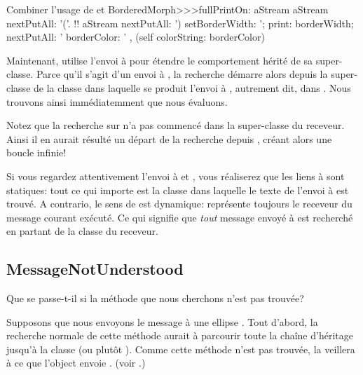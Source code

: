 \documentclass[a4paper,10pt,twoside]{book}
\begin{document}
\begin{method}[fullPrintOn]{Combiner l'usage de \super et \self}
BorderedMorph>>>fullPrintOn: aStream
	aStream nextPutAll: '('.
	!!
	aStream nextPutAll: ') setBorderWidth: '; print: borderWidth;
		nextPutAll: ' borderColor: ' , (self colorString: borderColor)
\end{method}
Maintenant,  utilise l'envoi à \super pour étendre le comportement  hérité de sa super-classe.
Parce qu'il s'agit d'un envoi à \super, la recherche démarre alors
depuis la super-classe de la classe dans laquelle se produit l'envoi à
\super, autrement dit, dans 
.
Nous trouvons ainsi immédiatemment  que nous évaluons.

Notez que la recherche sur \super n'a pas commencé dans la 
super-classe du receveur. Ainsi il en aurait résulté
un départ de la recherche depuis , 
créant alors une boucle infinie!


Si vous regardez attentivement l'envoi à \super et , vous réaliserez que les liens à \super sont statiques: tout ce qui importe
est la classe dans laquelle le texte de l'envoi à \super est trouvé.
A contrario, le sens de \self est dynamique: \self représente toujours le
receveur du message courant exécuté. Ce qui signifie que  \emph{tout} message envoyé à \self est recherché en partant de la classe du receveur.

\subsection{MessageNotUnderstood}

Que se passe-t-il si la méthode que nous cherchons n'est pas trouvée?

Supposons que nous envoyons le message  à une ellipse .
Tout d'abord, la recherche normale de cette méthode aurait à parcourir
toute la chaîne d'héritage jusqu'à la classe  (ou
plutôt ).
Comme cette méthode n'est pas trouvée, la  veillera
à ce que l'object envoie .
(voir .)
\end{document}
